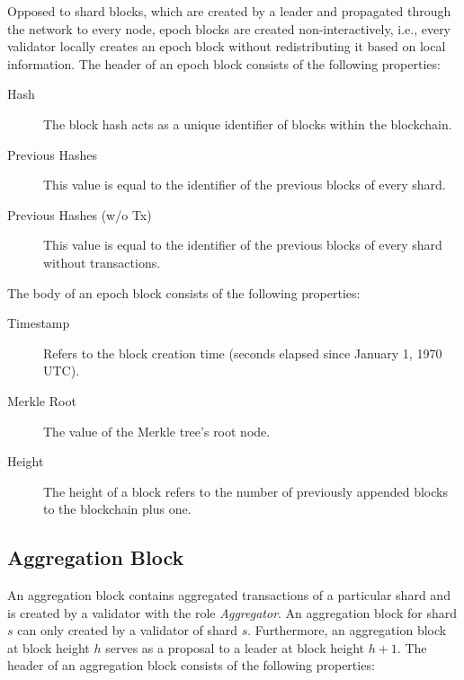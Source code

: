 Opposed to shard blocks, which are created by a leader and propagated through the network to every node, epoch blocks are created non-interactively, i.e., every validator locally creates an epoch block without redistributing it based on local information. The header of an epoch block consists of the following properties:

\begin{description}
  \item[Hash] The block hash acts as a unique identifier of blocks within the blockchain.
  \item[Previous Hashes] This value is equal to the identifier of the previous blocks of every shard.
  \item[Previous Hashes (w/o Tx)] This value is equal to the identifier of the previous blocks of every shard without transactions.
\end{description}

\noindent The body of an epoch block consists of the following properties:

\begin{description}
  \item[Timestamp] Refers to the block creation time (seconds elapsed since January 1, 1970 UTC).
  \item[Merkle Root] The value of the Merkle tree's root node.
  \item[Height] The height of a block refers to the number of previously appended blocks to the blockchain plus one.
  \end{description}

\subsection{Aggregation Block}

An aggregation block contains aggregated transactions of a particular shard and is created by a validator with the role \textit{Aggregator}. An aggregation block for shard $s$ can only created by a validator of shard $s$. Furthermore, an aggregation block at block height $h$ serves as a proposal to a leader at block height $h + 1$. The header of an aggregation block consists of the following properties:

